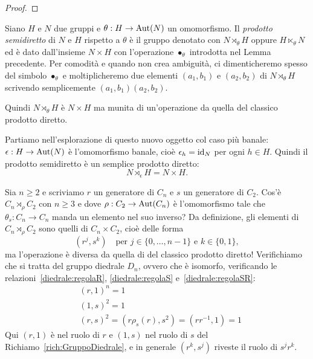\begin{proof}
\end{proof}

\begin{defi}\label{defi:SemidirettoEsterno}
Siano $H$ e $N$ due gruppi e $\theta : H \to \mathrm{Aut}(N)$ un omomorfismo. Il {\em prodotto semidiretto} di $N$ e $H$ rispetto a $\theta$ è il gruppo denotato con $N \rtimes_\theta H$ oppure $H \ltimes_\theta N$ ed è dato dall'insieme $N \times H$ con l'operazione \(\bullet_\theta\) introdotta nel Lemma precedente. Per comodità e quando non crea ambiguità, ci dimenticheremo spesso del simbolo $\bullet_\theta$ e moltiplicheremo due elementi $(a_1, b_1)$ e $(a_2, b_2)$ di $N \rtimes_\theta H$ scrivendo semplicemente $(a_1, b_1) (a_2, b_2)$.
\end{defi}

Quindi $N \rtimes_\theta H$ è $N \times H$ ma munita di un'operazione da quella del classico prodotto diretto.

\begin{esem}
Partiamo nell'esplorazione di questo nuovo oggetto col caso più banale: $\epsilon : H \to \mathrm{Aut}(N)$ è l'omomorfismo banale, cioè $\epsilon_h = \mathrm{id}_N$ per ogni $h \in H$. Quindi il prodotto semidiretto è un semplice prodotto diretto:
\[N \rtimes_\epsilon H = N \times H .\] 
\end{esem}

\begin{esem}\label{esem:GruppoDiedraleComeSemidiretto}
Sia $n \ge 2$ e scriviamo $r$ un generatore di $C_n$ e $s$ un generatore di $C_2$. Cos'è $C_n \rtimes_\rho C_2$ con $n \ge 3$ e dove $\rho : C_2 \to \mathrm{Aut}(C_n)$ è l'omomorfismo tale che $\theta_s : C_n \to C_n$ manda un elemento nel suo inverso? Da definizione, gli elementi di $C_n \rtimes_\rho C_2$ sono quelli di $C_n \times C_2$, cioè delle forma 
\[(r^j, s^k) \quad\text{per } j \in \{0, \dots, n-1\} \text{ e } k \in \{0, 1\},\]
ma l'operazione è diversa da quella di del classico prodotto diretto! Verifichiamo che si tratta del gruppo diedrale $D_n$, ovvero che è isomorfo, verificando le relazioni~\ref{diedrale:regolaR}, \ref{diedrale:regolaS} e~\ref{diedrale:regolaSR}:
\begin{align*}
& (r, 1)^n = 1 \\
& (1, s)^2 = 1 \\
& (r, s)^2 = \left(r \rho_s(r), s^2\right) = \left(rr^{-1}, 1\right) = 1
\end{align*}
Qui $(r, 1)$ è nel ruolo di $r$ e $(1, s)$ nel ruolo di $s$ del Richiamo~\ref{rich:GruppoDiedrale}, e in generale $(r^k, s^j)$ riveste il ruolo di $s^jr^k$. %
\end{esem}

